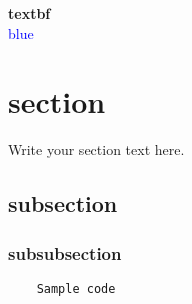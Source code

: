 \documentclass{article}
\begin{document}
\textbf{textbf}\\

\textcolor{blue}{blue}

\section{section}
Write your section text here.
\subsection{subsection}
\subsubsection{subsubsection}

\begin{verbatim}
    Sample code
\end{verbatim}

\end{document}

